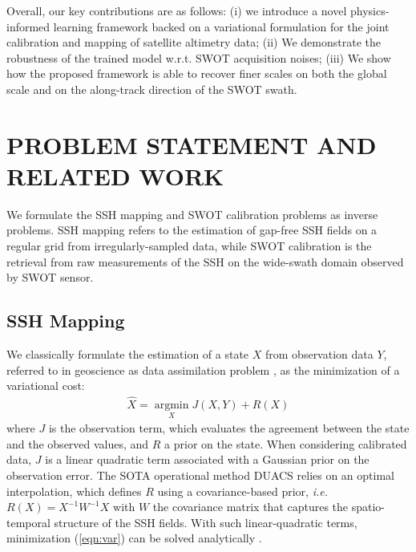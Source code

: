 \documentclass{article}
\begin{document}
Overall, our key contributions are as follows: (i) we introduce a novel physics-informed learning framework backed on a variational formulation for the joint calibration and mapping of satellite altimetry data; (ii) We demonstrate the robustness of the trained model w.r.t. SWOT acquisition noises; (iii) We show how the proposed framework is able to recover finer scales on both the global scale and on the along-track direction of the SWOT swath.



\section{PROBLEM STATEMENT AND RELATED WORK}

We formulate the SSH mapping and SWOT calibration problems as inverse problems. SSH mapping refers to the estimation of gap-free SSH fields on a regular grid from irregularly-sampled data, while SWOT calibration is the retrieval from raw measurements of the SSH on the wide-swath domain observed by SWOT sensor.

\subsection{SSH Mapping}
We classically formulate the estimation of a state $X$ from observation data $Y$, referred to in geoscience as data assimilation problem \cite{carrassi} ,  as the minimization of a variational cost:
\begin{align}
	\label{eqn:var}
	\hat{X} = \operatorname*{argmin}_X J(X, Y) + R(X)
\end{align}
where $J$ is the observation term, which evaluates the agreement between the state and the observed values, and $R$ a prior on the state.
When considering calibrated data, $J$ is a linear quadratic term associated with a Gaussian prior on the observation error. The SOTA operational method DUACS \cite{duacs} relies on an optimal interpolation, which defines $R$ using a covariance-based prior, {\em i.e.} $R(X) = X^{-1}W^{-1}X$ with $W$ the covariance matrix that captures the spatio-temporal structure of the SSH fields. With such linear-quadratic terms, minimization (\ref{eqn:var}) can be solved analytically \cite{10.1007/BFb0080117}.
\end{document}
